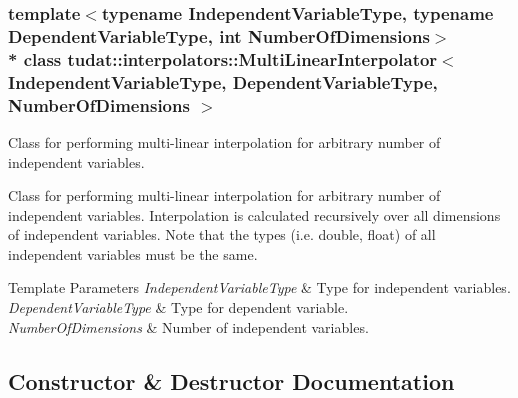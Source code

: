 \subsubsection*{template$<$typename Independent\+Variable\+Type, typename Dependent\+Variable\+Type, int Number\+Of\+Dimensions$>$\\*
class tudat\+::interpolators\+::\+Multi\+Linear\+Interpolator$<$ Independent\+Variable\+Type, Dependent\+Variable\+Type, Number\+Of\+Dimensions $>$}

Class for performing multi-\/linear interpolation for arbitrary number of independent variables. 

Class for performing multi-\/linear interpolation for arbitrary number of independent variables. Interpolation is calculated recursively over all dimensions of independent variables. Note that the types (i.\+e. double, float) of all independent variables must be the same. 
\begin{DoxyTemplParams}{Template Parameters}
{\em Independent\+Variable\+Type} & Type for independent variables. \\
\hline
{\em Dependent\+Variable\+Type} & Type for dependent variable. \\
\hline
{\em Number\+Of\+Dimensions} & Number of independent variables. \\
\hline
\end{DoxyTemplParams}


\subsection{Constructor \& Destructor Documentation}
